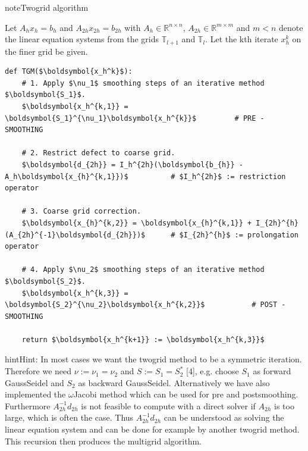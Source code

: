 \documentclass[letterpaper,10pt,english, openany]{sphinxmanual}
\begin{document}
\begin{sphinxadmonition}{note}{Two\sphinxhyphen{}grid algorithm}

Let \(A_h x_h = b_h\) and \(A_{2h} x_{2h} = b_{2h}\) with \(A_h \in \mathbb{R}^{n \times n}\),
\(A_{2h} \in \mathbb{R}^{m \times m}\) and \(m < n\)
denote the linear equation systems from the grids \(\mathbb{T}_{l+1}\) and \(\mathbb{T}_{l}\).
Let the k\sphinxhyphen{}th iterate \(x_h^k\) on the finer grid be given.

\begin{center}
\lstset{language=Python}
\begin{lstlisting}[mathescape=true]
def TGM($\boldsymbol{x_h^k}$):
	# 1. Apply $\nu_1$ smoothing steps of an iterative method $\boldsymbol{S_1}$.
	$\boldsymbol{x_h^{k,1}} = \boldsymbol{S_1}^{\nu_1}\boldsymbol{x_h^{k}}$			# PRE - SMOOTHING
	
	# 2. Restrict defect to coarse grid.
	$\boldsymbol{d_{2h}} = I_h^{2h}(\boldsymbol{b_{h}} - A_h\boldsymbol{x_{h}^{k,1}})$			# $I_h^{2h}$ := restriction operator
	
	# 3. Coarse grid correction.
	$\boldsymbol{x_{h}^{k,2}} = \boldsymbol{x_{h}^{k,1}} + I_{2h}^{h}(A_{2h}^{-1}\boldsymbol{d_{2h}})$		# $I_{2h}^{h}$ := prolongation operator
	
	# 4. Apply $\nu_2$ smoothing steps of an iterative method $\boldsymbol{S_2}$.
	$\boldsymbol{x_h^{k,3}} = \boldsymbol{S_2}^{\nu_2}\boldsymbol{x_h^{k,2}}$			# POST - SMOOTHING
	
	return $\boldsymbol{x_h^{k+1}} := \boldsymbol{x_h^{k,3}}$
\end{lstlisting}
\end{center}

\end{sphinxadmonition}

\begin{sphinxadmonition}{hint}{Hint:}
In most cases we want the two\sphinxhyphen{}grid method to be a symmetric iteration.
Therefore we need \(\nu := \nu_1 = \nu_2\) and \(S := S_1 = S_2^\ast\) {[}4{]},
e.g. choose \(S_1\) as forward Gauss\sphinxhyphen{}Seidel and \(S_2\) as backward Gauss\sphinxhyphen{}Seidel.
Alternatively we have also implemented the \(\omega\)\sphinxhyphen{}Jacobi method which can be used for pre\sphinxhyphen{} and post\sphinxhyphen{}smoothing.
Furthermore \(A_{2h}^{-1}d_{2h}\) is not feasible to compute with a direct solver
if \(A_{2h}\) is too large, which is often the case.
Thus \(A_{2h}^{-1}d_{2h}\) can be understood as solving the linear equation system and can be done for example by another two\sphinxhyphen{}grid method. This recursion then produces the multigrid algorithm.
\end{sphinxadmonition}
\end{document}
